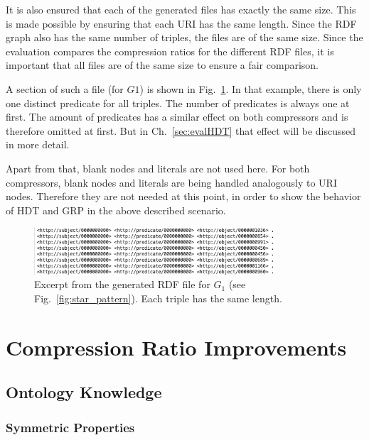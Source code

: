 It is also ensured that each of the generated files has exactly the same size. This is made possible by ensuring that each URI has the same length. Since the RDF graph also has the same number of triples, the files are of the same size. Since the evaluation compares the compression ratios for the different RDF files, it is important that all files are of the same size to ensure a fair comparison.

A section of such a file (for $G1$) is shown in Fig.~\ref{fig:rdfFile}. In that example, there is only one distinct predicate for all triples. The number of predicates is always one at first. The amount of predicates has a similar effect on both compressors and is therefore omitted at first. But in Ch.~\ref{sec:evalHDT} that effect will be discussed in more detail.

Apart from that, blank nodes and literals are not used here. For both compressors, blank nodes and literals are being handled analogously to URI nodes. Therefore they are not needed at this point, in order to show the behavior of HDT and GRP in the above described scenario.

\begin{figure}[h]
	\centering
	\includegraphics[width=0.8\textwidth]{figures/GRPvsHDT/file.png}
	\caption{Excerpt from the generated RDF file for $G_1$ (see Fig.~\ref{fig:star_pattern}). Each triple has the same length.}
	\label{fig:rdfFile}
\end{figure}

\section{Compression Ratio Improvements}\label{sec:implementationComprRatioImprovements}

\subsection{Ontology Knowledge}\label{sec:implementationOntKnowledge}

\subsubsection{Symmetric Properties}

